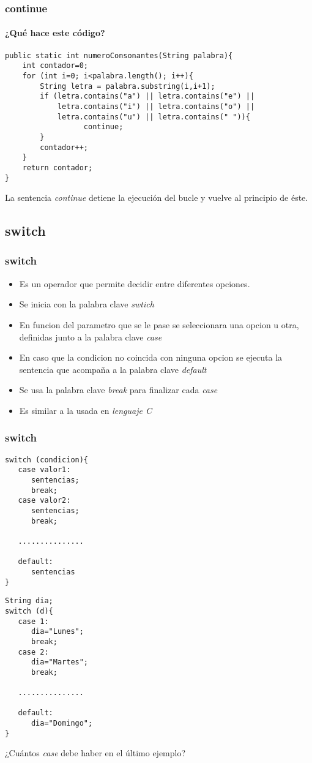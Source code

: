 \documentclass{beamer}
\begin{document}
\begin{frame}[fragile]
\frametitle{continue}
\framesubtitle{¿Qué hace este código?}
\begin{verbatim}
public static int numeroConsonantes(String palabra){
    int contador=0;
    for (int i=0; i<palabra.length(); i++){
        String letra = palabra.substring(i,i+1);
        if (letra.contains("a") || letra.contains("e") ||
            letra.contains("i") || letra.contains("o") ||
            letra.contains("u") || letra.contains(" ")){
                  continue;
        }
        contador++;
    }
    return contador;
}
\end{verbatim}
\pause
\alert{La sentencia \emph{continue} detiene la ejecución del bucle y vuelve al principio de éste.}
\end{frame}

\subsection{switch}
\begin{frame}
\frametitle{switch}
\begin{itemize}[<+->]
\item Es un operador que permite decidir entre diferentes opciones.
\item Se inicia con la palabra clave \emph{swtich}
\item En funcion del parametro que se le pase se seleccionara una opcion u otra, definidas junto a la palabra clave \emph{case}
\item En caso que la condicion no coincida con ninguna opcion se ejecuta la sentencia que acompaña a la palabra clave \emph{default}
\item Se usa la palabra clave \emph{break} para finalizar cada \emph{case}
\item Es similar a la usada en \emph{lenguaje C}
\end{itemize}
\pause
\end{frame}

\begin{frame}[fragile]
\frametitle{switch}
\begin{multicols}{2}
\begin{verbatim}
switch (condicion){
   case valor1:
      sentencias;
      break;
   case valor2:
      sentencias;
      break;
      
   ...............
   
   default:
      sentencias
}   
\end{verbatim}
\pause
\begin{verbatim}
String dia;
switch (d){
   case 1:
      dia="Lunes";
      break;
   case 2:
      dia="Martes";
      break;
      
   ...............
   
   default:
      dia="Domingo";
}   
\end{verbatim}
\end{multicols}
\pause
¿Cuántos \emph{case} debe haber en el último ejemplo?
\end{frame}
\end{document}
